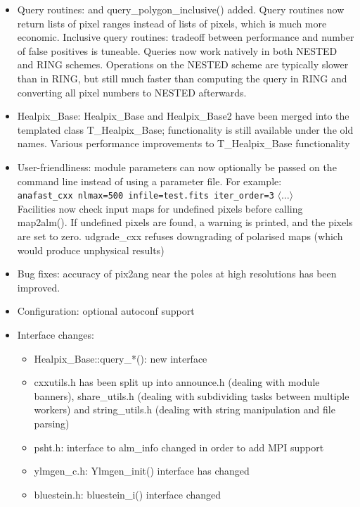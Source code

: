 \documentclass[12pt,twoside]{article}
\newcommand{\mytargetb}[2]{%
\latexhtml{\hbox{{#2}\hypertarget{#1}{}}}{\label{#1}{#2}}}
\begin{document}
{{
\begin{itemize}
	\setlength{\itemsep}{0pt}
	\setlength{\parsep}{0pt}
	\item Query routines:
 \mytargetb{install:cpp:query}{query\_polygon()} and query\_polygon\_inclusive() added.
Query routines now return lists of pixel ranges instead of lists of pixels,
 which is much more economic.
Inclusive query routines: tradeoff between performance and number of false
 positives is tuneable.
Queries now work natively in both NESTED and RING schemes. Operations on
 the NESTED scheme are typically slower than in RING, but still much faster
 than computing the query in RING and converting all pixel numbers to NESTED
 afterwards.

\item Healpix\_Base:
Healpix\_Base and Healpix\_Base2 have been merged into the templated class
 T\_Healpix\_Base; functionality is still available under the old names.
Various performance improvements to T\_Healpix\_Base functionality

\item User-friendliness:
module parameters can now optionally be passed on the command line instead
 of using a parameter file. For example:\\
   {\tt anafast\_cxx nlmax=500 infile=test.fits iter\_order=3} $\langle\ldots\rangle$\\
Facilities now check input maps for undefined pixels before calling map2alm().
 If undefined pixels are found, a warning is printed, and the pixels are set
 to zero. udgrade\_cxx refuses downgrading of polarised maps (which would produce
 unphysical results)
%
\item Bug fixes: accuracy of pix2ang near the poles at high resolutions has been improved.
%
\item Configuration: optional autoconf support
%
\item Interface changes:
%
\begin{itemize}
	\setlength{\itemsep}{0pt}
	\setlength{\parsep}{0pt}
\item Healpix\_Base::query\_*(): new interface
\item cxxutils.h has been split up into
 announce.h (dealing with module banners), 
 share\_utils.h (dealing with subdividing tasks between multiple workers) and
 string\_utils.h (dealing with string manipulation and file parsing)
\item psht.h: interface to alm\_info changed in order to add MPI support
\item ylmgen\_c.h: Ylmgen\_init() interface has changed
\item bluestein.h: bluestein\_i() interface changed
\end{itemize}


\end{itemize}}}
\end{document}
